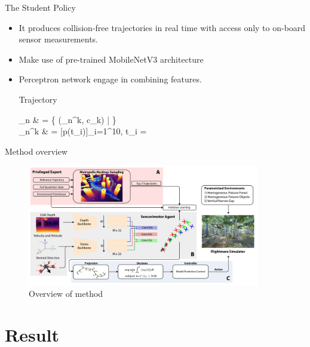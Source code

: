 \documentclass{beamer}
\begin{document}
\begin{frame}{The Student Policy}
	\begin{itemize}
		\item It produces collision-free trajectories in real time with access only to on-board sensor measurements.
		\item Make use of pre-trained MobileNetV3 architecture \autocite{MobileNet}
		\item Perceptron network engage in combining features.
		\begin{block}{Trajectory}
			\begin{flalign}
				_n & = \{ (\tau_n^k, c_k) | \in [0, 1, ..., M-1 ]\} \\
				\tau_n^k & = [p(t_i)]_{i=1}^{10}, t_i = 
			\end{flalign}
		\end{block}
		
	\end{itemize}
	
\end{frame}

\begin{frame}{Method overview}
	\begin{figure}
		\includegraphics[width=4in]{method-overview.png}
		\caption{Overview of method}
	\end{figure}
\end{frame}

\section{Result}
\end{document}
